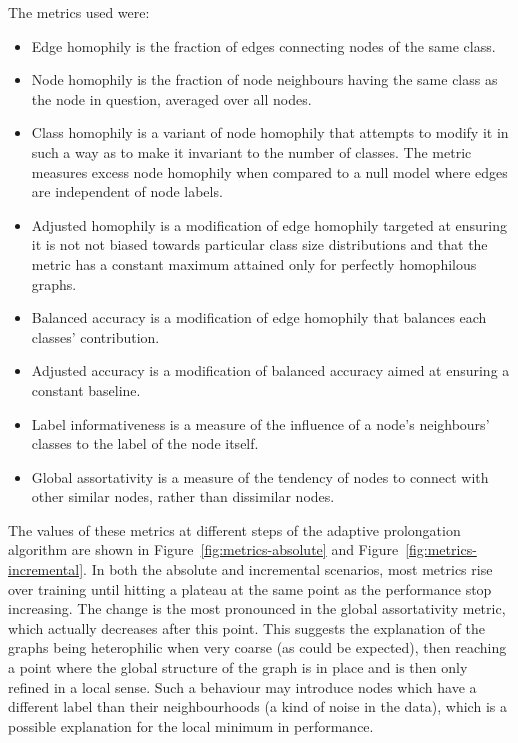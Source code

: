 The metrics used were:
\begin{itemize}
  \item Edge homophily \cite{zhu_beyond_2020} is the fraction of edges connecting nodes of the same class.
  \item Node homophily \cite{pei_geom-gcn_2020} is the fraction of node neighbours having the same class as the node in question, averaged over all nodes.
  \item Class homophily \cite{lim_large_2021} is a variant of node homophily that attempts to modify it in such a way as to make it invariant to the number of classes. The metric measures excess node homophily when compared to a null model where edges are independent of node labels.
  \item Adjusted homophily \cite{platonov_characterizing_2022} is a modification of edge homophily targeted at ensuring it is not not biased towards particular class size distributions and that the metric has a constant maximum attained only for perfectly homophilous graphs.
  \item Balanced accuracy \cite{platonov_characterizing_2022} is a modification of edge homophily that balances each classes' contribution.
  \item Adjusted accuracy \cite{platonov_characterizing_2022} is a modification of balanced accuracy aimed at ensuring a constant baseline.
  \item Label informativeness \cite{platonov_characterizing_2022} is a measure of the influence of a node's neighbours' classes to the label of the node itself.
  \item Global assortativity \cite{newman_mixing_2003} is a measure of the tendency of nodes to connect with other similar nodes, rather than dissimilar nodes.
\end{itemize}

The values of these metrics at different steps of the adaptive prolongation algorithm are shown in Figure~\ref{fig:metrics-absolute} and Figure~\ref{fig:metrics-incremental}. In both the absolute and incremental scenarios, most metrics rise over training until hitting a plateau at the same point as the performance stop increasing. The change is the most pronounced in the global assortativity metric, which actually decreases after this point. This suggests the explanation of the graphs being heterophilic when very coarse (as could be expected), then reaching a point where the global structure of the graph is in place and is then only refined in a local sense. Such a behaviour may introduce nodes which have a different label than their neighbourhoods (a kind of noise in the data), which is a possible explanation for the local minimum in performance.

